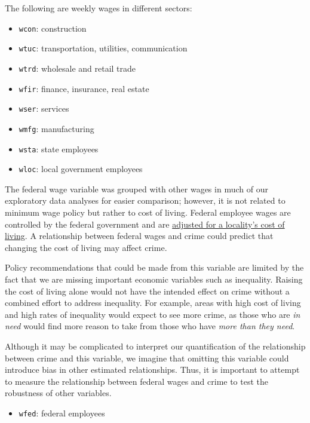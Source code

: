 \documentclass[]{article}
\providecommand{\tightlist}{%
  \setlength{\itemsep}{0pt}\setlength{\parskip}{0pt}}
\begin{document}
The following are weekly wages in different sectors:

\begin{itemize}
\tightlist
\item
  \texttt{wcon}: construction
\item
  \texttt{wtuc}: transportation, utilities, communication
\item
  \texttt{wtrd}: wholesale and retail trade
\item
  \texttt{wfir}: finance, insurance, real estate
\item
  \texttt{wser}: services
\item
  \texttt{wmfg}: manufacturing
\item
  \texttt{wsta}: state employees
\item
  \texttt{wloc}: local government employees
\end{itemize}

The federal wage variable was grouped with other wages in much of our
exploratory data analyses for easier comparison; however, it is not
related to minimum wage policy but rather to cost of living. Federal
employee wages are controlled by the federal government and are
\href{https://www.opm.gov/policy-data-oversight/pay-leave/salaries-wages/fact-sheets/}{adjusted
for a locality's cost of living}. A relationship between federal wages
and crime could predict that changing the cost of living may affect
crime.

Policy recommendations that could be made from this variable are limited
by the fact that we are missing important economic variables such as
inequality. Raising the cost of living alone would not have the intended
effect on crime without a combined effort to address inequality. For
example, areas with high cost of living and high rates of inequality
would expect to see more crime, as those who are \emph{in need} would
find more reason to take from those who have \emph{more than they need}.

Although it may be complicated to interpret our quantification of the
relationship between crime and this variable, we imagine that omitting
this variable could introduce bias in other estimated relationships.
Thus, it is important to attempt to measure the relationship between
federal wages and crime to test the robustness of other variables.

\begin{itemize}
\tightlist
\item
  \texttt{wfed}: federal employees
\end{itemize}
\end{document}
